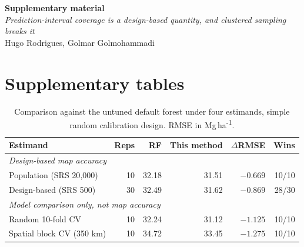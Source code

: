 \documentclass[preprint,12pt,authoryear]{elsarticle}
\newcommand{\Mgha}{Mg\,ha\textsuperscript{-1}}
\begin{document}
\begin{center}
{\large\bfseries Supplementary material}\\[2pt]
{\itshape Prediction-interval coverage is a design-based quantity, and clustered
sampling breaks it}\\[2pt]
Hugo Rodrigues, Golmar Golmohammadi
\end{center}

\vspace{1em}

\section*{Supplementary tables}

\begin{table}[!ht]
\centering
\caption{Comparison against the untuned default forest under four estimands,
simple random calibration design. RMSE in \Mgha{}.}
\label{stab:estimands}
\small
\begin{tabular}{lrrrrr}
\toprule
Estimand & Reps & RF & This method & $\Delta$RMSE & Wins \\
\midrule
\multicolumn{6}{l}{\emph{Design-based map accuracy}} \\
Population (SRS 20{,}000) & 10 & 32.18 & 31.51 & $-0.669$ & 10/10 \\
Design-based (SRS 500)    & 30 & 32.49 & 31.62 & $-0.869$ & 28/30 \\
\midrule
\multicolumn{6}{l}{\emph{Model comparison only, not map accuracy}} \\
Random 10-fold CV         & 10 & 32.24 & 31.12 & $-1.125$ & 10/10 \\
Spatial block CV (350 km) & 10 & 34.72 & 33.45 & $-1.275$ & 10/10 \\
\bottomrule
\end{tabular}
\end{table}

\begin{table}[!ht]
\centering
\caption{Selected corrector across all 90 repetitions.}
\label{stab:modes}
\small

\end{table}

\begin{table}[!ht]
\centering
\caption{Simulation S1. Proportion of runs in which anisotropy is declared, by
true ratio and signal-to-noise ratio, under simple random sampling with 500
points. A true ratio of 1 is an isotropic field.}
\label{stab:sim1}
\small

\end{table}
\end{document}
